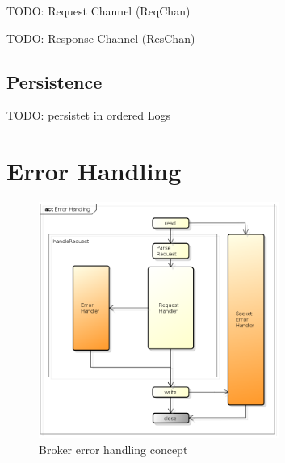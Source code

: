 TODO: Request Channel (ReqChan)

TODO: Response Channel (ResChan)

\subsection{Persistence}
TODO: persistet in ordered Logs


 






\section{Error Handling}

\begin{figure}[H]
    \centering
    \includegraphics[width=0.7\textwidth]{images/broker-error-activity.png}
    \caption{Broker error handling concept}
    \label{fig:broker-error-activity.png}
\end{figure}


